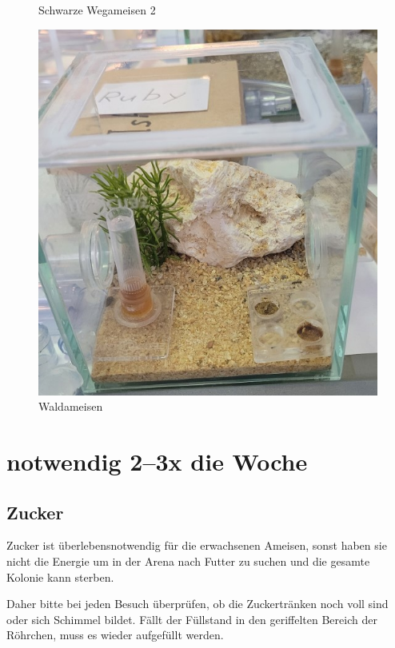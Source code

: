 \begin{figure}[H]
\begin{minipage}{.5\textwidth}
    \caption[Wegameisen2]{Schwarze Wegameisen 2}
  \end{minipage}
\end{figure}
\begin{figure}[H]
  \begin{minipage}{.5\textwidth}
    \centering
    \includegraphics[width=.8\linewidth]{resources/F-rufibarbis.jpg}
    \caption[Waldameisen]{Waldameisen}
  \end{minipage}%
  \begin{minipage}{.5\textwidth}
  \end{minipage}
\end{figure}

\section{notwendig 2--3x die Woche}

\subsection{Zucker}\label{sec:Ameisen_sub:Zucker}
Zucker ist überlebensnotwendig für die erwachsenen Ameisen,
sonst haben sie nicht die Energie um in der Arena nach Futter zu suchen und die gesamte Kolonie kann sterben.

Daher bitte bei jeden Besuch überprüfen, ob die Zuckertränken noch voll sind oder sich Schimmel bildet.
Fällt der Füllstand in den geriffelten Bereich der Röhrchen,
muss es wieder aufgefüllt werden.

